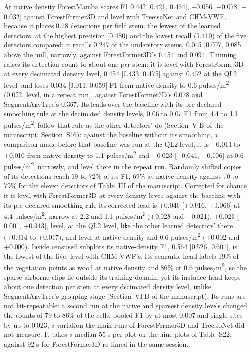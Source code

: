 \documentclass[10pt]{article}
\begin{document}
At native density ForestMamba scores F1 0.442 [0.421, 0.464], $-$0.056 [$-$0.078,
$-$0.032] against ForestFormer3D and level with TreeisoNet and CHM-VWF, because it
places 0.78 detections per field stem, the fewest of the learned detectors, at
the highest precision (0.480) and the lowest recall (0.410) of the five
detectors compared; it recalls 0.247 of the understory stems, 0.045 [0.007,
0.085] above the null, narrowly, against ForestFormer3D's 0.454 and 0.094.
Thinning raises its detection count to about one per stem: it is level with
ForestFormer3D at every decimated density level, 0.454 [0.433, 0.475] against
0.452 at the QL2 level, and loses 0.034 [0.011, 0.059] F1 from native density to
0.6 pulses/m\textsuperscript{2} (0.022, level, in a repeat run), against ForestFormer3D's 0.078
and SegmentAnyTree's 0.367. Its leads over the baseline with its pre-declared
smoothing rule at the decimated density levels, 0.06 to 0.07 F1 from 4.4 to 1.1
pulses/m\textsuperscript{2}, follow that rule as the other detectors' do (Section~V-B of the
manuscript; Section~S16): against the baseline without its smoothing, a
comparison made before that baseline was run at the QL2 level, it is $-$0.011 to
+0.010 from native density to 1.1 pulses/m\textsuperscript{2} and $-$0.023 [$-$0.041, $-$0.006] at 0.6
pulses/m\textsuperscript{2}, narrowly, and level there in the repeat run. Randomly shifted copies
of its detections reach 69 to 72\% of its F1, 69\% at native density against 70 to
79\% for the eleven detectors of Table~III of the manuscript. Corrected for chance
it is level with ForestFormer3D at every density level; against the baseline
with its pre-declared smoothing rule its corrected lead is +0.040 [+0.016,
+0.066] at 4.4 pulses/m\textsuperscript{2}, narrow at 2.2 and 1.1 pulses/m\textsuperscript{2} (+0.028 and +0.021),
+0.020 [$-$0.001, +0.043], level, at the QL2 level, like the other learned
detectors' there (+0.014 to +0.017), and level at native density and 0.6
pulses/m\textsuperscript{2} (+0.002 and +0.000). Inside censused subplots its native-density F1,
0.564 [0.526, 0.601], is the lowest of the five, level with CHM-VWF's. Its
semantic head labels 19\% of the vegetation points as wood at native density and
86\% at 0.6 pulses/m\textsuperscript{2}, so the sparse airborne clips lie outside its training
domain, yet its instance head keeps about one detection per stem at every
decimated density level, unlike SegmentAnyTree's grouping stage (Section~VI-B of
the manuscript). Its runs are not bit-repeatable: a second run at the native and
sparsest density levels changed the counts of 79 to 86\% of the cells, pooled F1
by at most 0.007 and single sites by up to 0.023, a variation the main runs of
ForestFormer3D and TreeisoNet did not measure. It takes a median 55 s per plot
on the nine plots of Table~S22, against 92 s for ForestFormer3D re-timed in the
same session.
\end{document}
